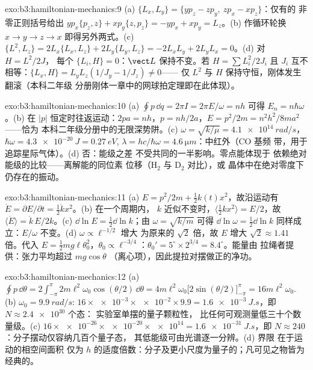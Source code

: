 \begin{solution}{exo:b3:hamiltonian-mechanics:9}
(a) $\{L_x, L_y\} = \{yp_z - zp_y,\ zp_x - xp_z\}$：仅有的
非零正则括号给出 $yp_x\{p_z, z\} + xp_y\{z,
p_z\} = -yp_x + xp_y = L_z$。(b) 作循环轮换 $x \to y \to z \to
x$ 即得另外两式。(c) $\{L^2, L_z\} = 2L_x\{L_x, L_z\} +
2L_y\{L_y, L_z\} = -2L_xL_y + 2L_yL_x = 0$。(d) 对 $H = L^2/2J$，
每个 $\{L_i, H\} = 0$：$\vect L$ 保持不变。若 $H = \sum L_i^2/2J_i$
且 $J_i$ 互不相等：$\{L_x, H\} = L_yL_z(1/J_y - 1/J_z) \neq 0$——
仅 $L^2$ 与 $H$ 保持守恒，刚体发生翻滚（本科二年级
分册刚体一章中的网球拍定理即在此体现）。
\end{solution}

\begin{solution}{exo:b3:hamiltonian-mechanics:10}
(a) $\oint p\,\dd q = 2\pi I = 2\pi E/\omega = nh$ 可得 $E_n =
n\hbar\omega$。(b) 在 $|p|$ 恒定时往返运动：$2pa = nh$，$p =
nh/2a$，$E = p^2/2m = n^2h^2/8ma^2$——恰为
本科二年级分册中的无限深势阱。(c) $\omega = \sqrt{k/\mu} = \qty{4.1e14}{rad/s}$，
$\hbar\omega = \qty{4.3e-20}{J} = \qty{0.27}{eV}$, $\lambda = hc/
\hbar\omega = \qty{4.6}{\micro m}$：中红外（CO 基频
带，用于追踪星际气体）。(d) 否：能级之差
不受共同的一半影响。零点能体现于
依赖绝对能级的比较——离解能的同位素
位移（H$_2$ 与 D$_2$ 对比），或
晶体中在绝对零度下仍存在的振动。
\end{solution}

\begin{solution}{exo:b3:hamiltonian-mechanics:11}
(a) $E = p^2/2m + \tfrac12 k(t)x^2$，故沿运动有 $\dot E =
\partial E/\partial t = \tfrac12\dot kx^2$。(b) 在一个周期内，
$k$ 近似不变时，$\langle\tfrac12 kx^2\rangle = E/2$，故
$\langle\dot E\rangle = \dot k\,E/2k$。(c) $\dd\ln E = \tfrac12\dd\ln
k$；由 $\omega = \sqrt{k/m}$ 可得 $\dd\ln\omega = \tfrac12\dd\ln k$
同样成立：$E/\omega$ 不变。(d) $\omega \propto \ell^{-1/2}$ 增大
为原来的 $\sqrt2$ 倍，故 $E$ 增大 $\sqrt2 \approx 1.41$ 倍。代入 $E = \tfrac12
mg\ell\theta_0^2$，$\theta_0 \propto \ell^{-3/4}$：$\theta_0' =
5^\circ \times 2^{3/4} = 8.4^\circ$。能量由
拉绳者提供：张力平均超过 $mg\cos\theta$
（离心项），因此提拉对摆做正的净功。
\end{solution}

\begin{solution}{exo:b3:hamiltonian-mechanics:12}
(a) $\oint p\,\dd\theta = 2\int_{-\pi}^{\pi}2m\ell^2\omega_0
\cos(\theta/2)\,\dd\theta = 4m\ell^2\omega_0\big[2\sin(\theta/2)
\big]_{-\pi}^{\pi} = 16m\ell^2\omega_0$. (b) $\omega_0 =
\qty{9.9}{rad/s}$: $16 \times \num{e-3} \times \num{e-2} \times 9.9 =
\qty{1.6e-3}{J.s}$，即 $N \approx \num{2.4e30}$ 个态：
实验室单摆的量子颗粒性，
比任何可观测量低三十个数量级。(c) $16 \times \num{e-26} \times
\num{e-20} \times \num{e14} = \qty{1.6e-31}{J.s}$，即 $N \approx
240$：分子摆动仅容纳几百个量子态，
其低能级可由光谱逐一分辨。(d) 界限
在于运动的相空间面积
仅为 $h$ 的适度倍数：分子及更小尺度为量子的；凡可见之物皆为经典的。
\end{solution}

